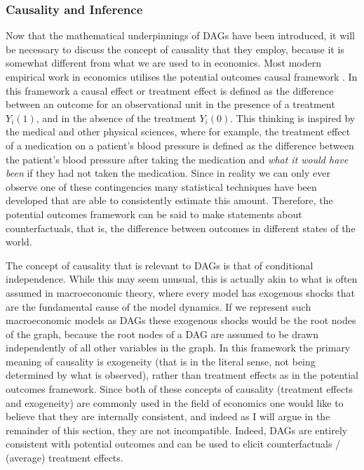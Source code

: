 \documentclass{article}
\begin{document}
\subsubsection{Causality and Inference} \label{cause}

Now that the mathematical underpinnings of DAGs have been introduced, it will be necessary to discuss the concept of causality that they employ, because it is somewhat different from what we are used to in economics. Most modern empirical work in economics utilises the potential outcomes causal framework \parencite{holland1986statistics}. In this framework a causal effect or treatment effect is defined as the difference between an outcome for an observational unit in the presence of a treatment $Y_i(1)$, and in the absence of the treatment $Y_i(0)$. This thinking is inspired by the medical and other physical sciences, where for example, the treatment effect of a medication on a patient's blood pressure is defined as the difference between the patient's blood pressure after taking the medication and \textit{what it would have been} if they had not taken the medication. Since in reality we can only ever observe one of these contingencies many statistical techniques have been developed that are able to consistently estimate this amount. Therefore, the potential outcomes framework can be said to make statements about counterfactuals, that is, the difference between outcomes in different states of the world.

The concept of causality that is relevant to DAGs is that of conditional independence. While this may seem unusual, this is actually akin to what is often assumed in macroeconomic theory, where every model has exogenous shocks that are the fundamental cause of the model dynamics. If we represent such macroeconomic models as DAGs these exogenous shocks would be the root nodes of the graph, because the root nodes of a DAG are assumed to be drawn independently of all other variables in the graph. In this framework the primary meaning of causality is exogeneity (that is in the literal sense, not being determined by what is observed), rather than treatment effects as in the potential outcomes framework. Since both of these concepts of causality (treatment effects and exogeneity) are commonly used in the field of economics one would like to believe that they are internally consistent, and indeed as I will argue in the remainder of this section, they are not incompatible. Indeed, DAGs are entirely consistent with potential outcomes and can be used to elicit counterfactuals / (average) treatment effects.
\end{document}
